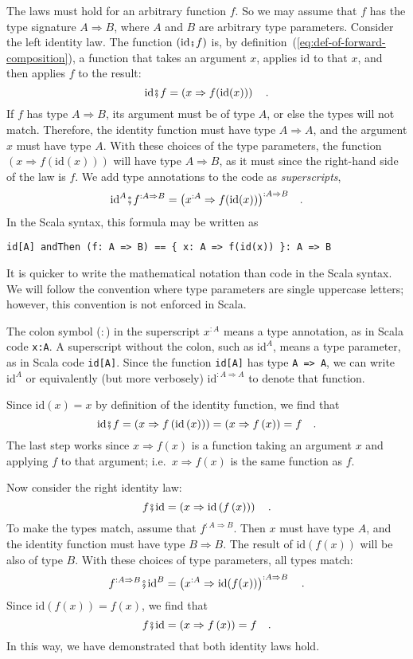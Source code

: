 The laws must hold for an arbitrary function $f$. So we may assume
that $f$ has the type signature $A\Rightarrow B$, where $A$ and
$B$ are arbitrary type parameters. Consider the left identity law.
The function $\left(\text{id}\bef f\right)$ is, by definition~(\ref{eq:def-of-forward-composition}),
a function that takes an argument $x$, applies $\text{id}$ to that
$x$, and then applies $f$ to the result: 
\[
\text{id}\bef f=\left(x\Rightarrow f(\text{id}(x))\right)\quad.
\]
If $f$ has type $A\Rightarrow B$, its argument must be of type $A$,
or else the types will not match. Therefore, the identity function
must have type $A\Rightarrow A$, and the argument $x$ must have
type $A$. With these choices of the type parameters, the function
$\left(x\Rightarrow f(\text{id}(x))\right)$ will have type $A\Rightarrow B$,
as it must since the right-hand side of the law is $f$. We add type
annotations to the code as \emph{superscripts},
\[
\text{id}^{A}\bef f^{:A\Rightarrow B}=\big(x^{:A}\Rightarrow f(\text{id}(x))\big)^{:A\Rightarrow B}\quad.
\]
In the Scala syntax, this formula may be written as
\begin{lstlisting}
id[A] andThen (f: A => B) == { x: A => f(id(x)) }: A => B
\end{lstlisting}
It is quicker to write the mathematical notation than code in the
Scala syntax. We will follow the convention where type parameters
are single uppercase letters; however, this convention is not enforced
in Scala.

The colon symbol ($:$) in the superscript $x^{:A}$ means a type
annotation, as in Scala code \lstinline!x:A!. A superscript without
the colon, such as $\text{id}^{A}$, means a type parameter, as in
Scala code \lstinline!id[A]!. Since the function \lstinline!id[A]!
has type \lstinline!A => A!, we can write $\text{id}^{A}$ or equivalently
(but more verbosely) $\text{id}^{:A\Rightarrow A}$ to denote that
function.

Since $\text{id}(x)=x$ by definition of the identity function, we
find that 
\[
\text{id}\bef f=\left(x\Rightarrow f\left(\text{id}\left(x\right)\right)\right)=\left(x\Rightarrow f\left(x\right)\right)=f\quad.
\]
The last step works since $x\Rightarrow f\left(x\right)$ is a function
taking an argument $x$ and applying $f$ to that argument; i.e.~$x\Rightarrow f\left(x\right)$
is the same function as $f$.

Now consider the right identity law:
\[
f\bef\text{id}=\left(x\Rightarrow\text{id}\left(f\left(x\right)\right)\right)\quad.
\]
To make the types match, assume that $f^{:A\Rightarrow B}$. Then
$x$ must have type $A$, and the identity function must have type
$B\Rightarrow B$. The result of $\text{id}\left(f\left(x\right)\right)$
will be also of type $B$. With these choices of type parameters,
all types match:
\[
f^{:A\Rightarrow B}\bef\text{id}^{B}=\left(x^{:A}\Rightarrow\text{id}(f(x))\right)^{:A\Rightarrow B}\quad.
\]
Since $\text{id}(f(x))=f(x)$, we find that 
\[
f\bef\text{id}=\left(x\Rightarrow f\left(x\right)\right)=f\quad.
\]
In this way, we have demonstrated that both identity laws hold. 

